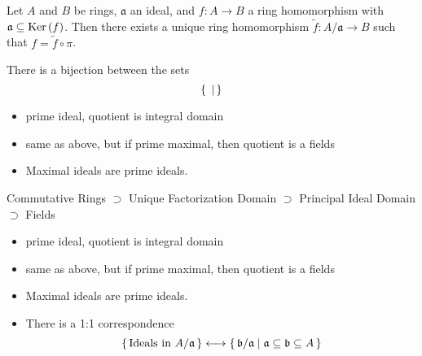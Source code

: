 \begin{prps}
    Let \(A\) and \(B\) be rings, \(\mathfrak{a}\) an ideal, and \(f: A \longrightarrow B\) a ring homomorphism with \(\mathfrak{a} \subseteq \mathrm{Ker} \left( f \right)\). Then there exists a unique ring homomorphism \(\tilde{f}: A / \mathfrak{a} \longrightarrow B\) such that \(f = \tilde{f} \circ \pi\).
\end{prps}

\begin{thm}
    There is a bijection between the sets
    \begin{equation}
        \left\{\, \mathfrak{} \mathrel{\mid}  \,\right\}
    \end{equation}
\end{thm}

\begin{defn}
    
\end{defn}

\begin{thm}
    \begin{itemize}
        \item prime ideal, quotient is integral domain
        \item same as above, but if prime maximal, then quotient is a fields
        \item Maximal ideals are prime ideals.
    \end{itemize}
\end{thm}

\begin{defn}
    
\end{defn}

\begin{defn}
    
\end{defn}

\begin{prps}
    Commutative Rings \(\supset\) Unique Factorization Domain \(\supset\) Principal Ideal Domain \(\supset\) Fields
\end{prps}

\begin{thm}
    \begin{itemize}
        \item prime ideal, quotient is integral domain
        \item same as above, but if prime maximal, then quotient is a fields
        \item Maximal ideals are prime ideals.
        \item There is a 1:1 correspondence
        \begin{equation}
            \left\{\, \text{Ideals in \(A / \mathfrak{a}\)} \,\right\} \longleftrightarrow \left\{\, \mathfrak{b} / \mathfrak{a} \mathrel{\mid} \mathfrak{a} \subseteq \mathfrak{b} \subseteq A \,\right\}
        \end{equation}
    \end{itemize}
\end{thm}

